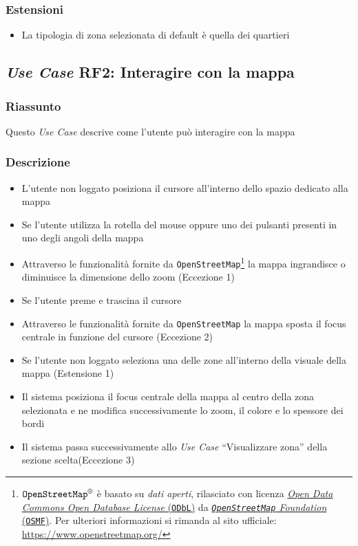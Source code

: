         \subsubsection{Estensioni}
            \begin{itemize}
                \item La tipologia di zona selezionata di default è quella dei quartieri
            \end{itemize}
    
    \subsection{\textit{Use Case} RF2: Interagire con la mappa}
        \subsubsection{Riassunto}
            Questo \textit{Use Case} descrive come l'utente può interagire con la mappa
        \subsubsection{Descrizione}
            \begin{itemize}
                \item L'utente non loggato posiziona il cursore all'interno dello spazio dedicato alla mappa
                \item Se l'utente utilizza la rotella del mouse oppure uno dei pulsanti presenti in uno degli angoli della mappa
                \item Attraverso le funzionalità fornite da \texttt{OpenStreetMap}\footnote{
                    \label{note:osm}
                    $ \text{\texttt{OpenStreetMap}}^{\text{\textregistered}} $ è basato su \textit{dati aperti}, rilasciato con licenza \href{https://opendatacommons.org/licenses/odbl/}{\textit{Open Data Commons Open Database License} (\texttt{ODbL})} da \href{https://osmfoundation.org/}{\textit{\texttt{OpenStreetMap} Foundation} (\texttt{OSMF})}. Per ulteriori informazioni si rimanda al sito ufficiale: \url{https://www.openstreetmap.org/}
                } la mappa ingrandisce o diminuisce la dimensione dello zoom (Eccezione 1)
                \item Se l'utente preme e trascina il cursore
                \item Attraverso le funzionalità fornite da \texttt{OpenStreetMap} la mappa sposta il focus centrale in funzione del cursore (Eccezione 2)
                \item Se l'utente non loggato seleziona una delle zone all'interno della visuale della mappa (Estensione 1)
                \item Il sistema posiziona il focus centrale della mappa al centro della zona selezionata e ne modifica successivamente lo zoom, il colore e lo spessore dei bordi
                \item Il sistema passa successivamente allo \textit{Use Case} ``Visualizzare zona'' della sezione scelta(Eccezione 3)
            \end{itemize}
